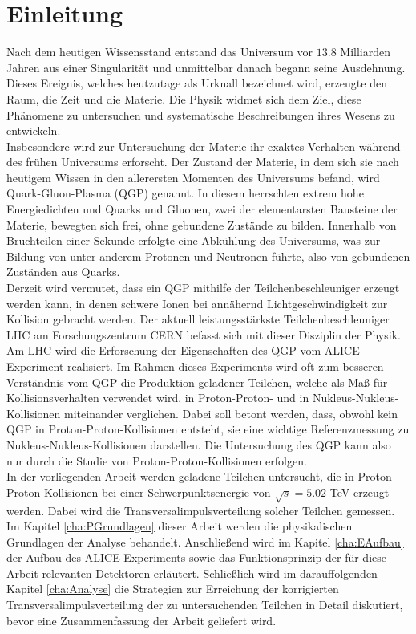 \documentclass[12pt,a4paper]{report}
\begin{document}
\chapter{Einleitung}
Nach dem heutigen Wissensstand entstand das Universum vor $13.8$ Milliarden Jahren aus einer Singularität und unmittelbar danach begann seine Ausdehnung. Dieses Ereignis, welches heutzutage als Urknall bezeichnet wird, erzeugte den Raum, die Zeit und die Materie. Die Physik widmet sich dem Ziel, diese Phänomene zu untersuchen und systematische Beschreibungen ihres Wesens zu entwickeln.\\
Insbesondere wird zur Untersuchung der Materie ihr exaktes Verhalten während des frühen Universums erforscht. Der Zustand der Materie, in dem sich sie nach heutigem Wissen in den allerersten Momenten des Universums befand, wird Quark-Gluon-Plasma (QGP) genannt. In diesem herrschten extrem hohe Energiedichten und Quarks und Gluonen, zwei der elementarsten Bausteine der Materie, bewegten sich frei, ohne gebundene Zustände zu bilden. Innerhalb von Bruchteilen einer Sekunde erfolgte eine Abkühlung des Universums, was zur Bildung von unter anderem Protonen und Neutronen führte, also von gebundenen Zuständen aus Quarks.\\
Derzeit wird vermutet, dass ein QGP mithilfe der Teilchenbeschleuniger erzeugt werden kann, in denen schwere Ionen bei annähernd Lichtgeschwindigkeit zur Kollision gebracht werden. Der aktuell leistungsstärkste Teilchenbeschleuniger LHC am Forschungszentrum CERN befasst sich mit dieser Disziplin der Physik. Am LHC wird die Erforschung der Eigenschaften des QGP vom ALICE-Experiment realisiert. Im Rahmen dieses Experiments wird oft zum besseren Verständnis vom QGP die Produktion geladener Teilchen, welche als Maß für Kollisionsverhalten verwendet wird, in Proton-Proton- und in Nukleus-Nukleus-Kollisionen miteinander verglichen. Dabei soll betont werden, dass, obwohl kein QGP in Proton-Proton-Kollisionen entsteht, sie eine wichtige Referenzmessung zu Nukleus-Nukleus-Kollisionen darstellen. Die Untersuchung des QGP kann also nur durch die Studie von Proton-Proton-Kollisionen erfolgen. \\
In der vorliegenden Arbeit werden geladene Teilchen untersucht, die in Proton-Proton-Kollisionen bei einer Schwerpunktsenergie von $\sqrt{s} = 5.02$ TeV erzeugt werden. Dabei wird die Transversalimpulsverteilung solcher Teilchen gemessen. Im Kapitel \ref{cha:PGrundlagen} dieser Arbeit werden die physikalischen Grundlagen der Analyse behandelt. Anschließend wird im Kapitel  \ref{cha:EAufbau} der Aufbau des ALICE-Experiments sowie das Funktionsprinzip der für diese Arbeit relevanten Detektoren erläutert. Schließlich wird im darauffolgenden Kapitel \ref{cha:Analyse} die Strategien zur Erreichung der korrigierten Transversalimpulsverteilung der zu untersuchenden Teilchen in Detail diskutiert, bevor eine Zusammenfassung der Arbeit geliefert wird.
\end{document}
